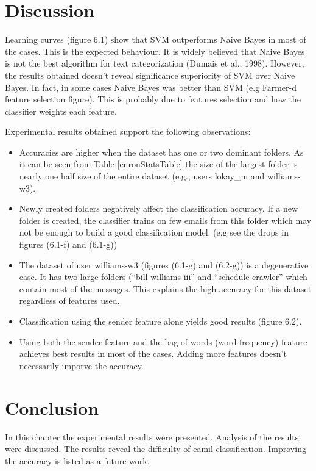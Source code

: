 \section{Discussion}
Learning curves (figure 6.1) show that SVM outperforms Naive Bayes in most of the cases. This is the expected behaviour. It is widely believed that Naive Bayes is not the best algorithm for text categorization (Dumais et al., 1998)\cite{DHS98}.
However, the results obtained doesn't reveal significance superiority of SVM over Naive Bayes. In fact, in some cases Naive Bayes was better than SVM (e.g Farmer-d feature selection figure). This is probably due to features selection and how the classifier weights each feature.


Experimental results obtained support the following observations:
\begin{itemize}
\item Accuracies are higher when the dataset has one or two dominant folders. As it can be seen from Table \ref{enronStatsTable}
 the size of the largest folder is nearly one half size of the entire dataset (e.g., users lokay\_m and williams-w3).

\item Newly created folders negatively affect the classification accuracy. If a new folder is created, the classifier trains on few emails from this folder which may not be enough to build a good classification model. (e.g see the drops in figures (6.1-f) and (6.1-g))

\item The dataset of user williams-w3 (figures (6.1-g) and (6.2-g)) is a degenerative case. It has two large folders (``bill williams iii'' and ``schedule crawler'' which contain most of the messages. This explains the high accuracy for this dataset regardless of features used.

\item Classification using the sender feature alone yields good results (figure 6.2).

\item Using both the sender feature and the bag of words (word frequency) feature achieves best results in most of the cases. Adding more features doesn't necessarily imporve the accuracy.

\end{itemize}

\section{Conclusion}
In this chapter the experimental results were presented. Analysis of the results were discussed. The results reveal the difficulty of eamil classification. Improving the accuracy is listed as a future work.

